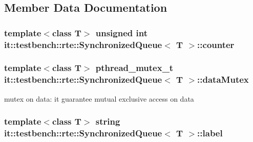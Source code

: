 \subsection{Member Data Documentation}
\hypertarget{classit_1_1testbench_1_1rte_1_1SynchronizedQueue_a430d81d803d75be8adef0fc2440678be}{
\subsubsection[{counter}]{\setlength{\rightskip}{0pt plus 5cm}template$<$class T$>$ unsigned int {\bf it\-::testbench\-::rte\-::\-Synchronized\-Queue}$<$ T $>$\-::counter\hspace{0.3cm}{\ttfamily [protected]}}}\label{d6/dec/classit_1_1testbench_1_1rte_1_1SynchronizedQueue_a430d81d803d75be8adef0fc2440678be}
\hypertarget{classit_1_1testbench_1_1rte_1_1SynchronizedQueue_aba0a875f1b456aec7f7262576fb02773}{
\subsubsection[{data\-Mutex}]{\setlength{\rightskip}{0pt plus 5cm}template$<$class T$>$ pthread\-\_\-mutex\-\_\-t {\bf it\-::testbench\-::rte\-::\-Synchronized\-Queue}$<$ T $>$\-::data\-Mutex\hspace{0.3cm}{\ttfamily [protected]}}}\label{d6/dec/classit_1_1testbench_1_1rte_1_1SynchronizedQueue_aba0a875f1b456aec7f7262576fb02773}
mutex on data\-: it guarantee mutual exclusive access on data \hypertarget{classit_1_1testbench_1_1rte_1_1SynchronizedQueue_adef1028de164827d377ae7d9a3783bff}{
\subsubsection[{label}]{\setlength{\rightskip}{0pt plus 5cm}template$<$class T$>$ string {\bf it\-::testbench\-::rte\-::\-Synchronized\-Queue}$<$ T $>$\-::label\hspace{0.3cm}{\ttfamily [protected]}}}\label{d6/dec/classit_1_1testbench_1_1rte_1_1SynchronizedQueue_adef1028de164827d377ae7d9a3783bff}
